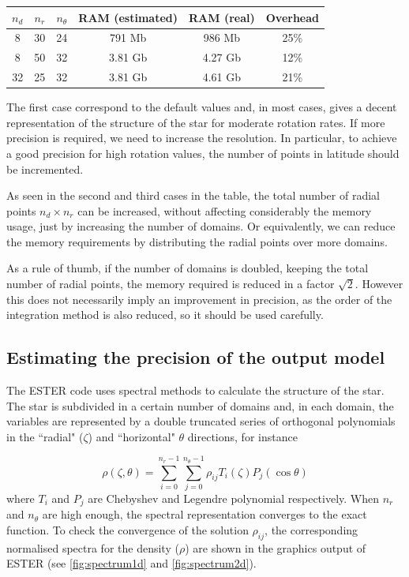 \begin{center}
\begin{tabular}{c|c|c|c|c|c}
$n_d$&$n_r$&$n_\theta$&RAM (estimated)&RAM (real)&Overhead\\
\hline
8&30&24& 791 Mb & 986 Mb & 25\% \\
8&50&32& 3.81 Gb & 4.27 Gb & 12\% \\
32&25&32& 3.81 Gb & 4.61 Gb & 21\% \\
\end{tabular}
\end{center}

The first case correspond to the default values and, in most cases,
gives a decent representation of the structure of the star for moderate
rotation rates.  If more precision is required, we need to increase the
resolution. In particular, to achieve a good precision for high rotation
values, the number of points in latitude should be incremented.

As seen in the second and third cases in the table, the total number
of radial points $n_d\times n_r$ can be increased, without affecting
considerably the memory usage, just by increasing the number of domains.
Or equivalently, we can reduce the memory requirements by distributing
the radial points over more domains.

As a rule of thumb, if the number of domains is doubled, keeping the
total number of radial points, the memory required is reduced in a factor
$\sqrt{2}$. However this does not necessarily imply an improvement
in precision, as the order of the integration method is also reduced,
so it should be used carefully.

\subsection{Estimating the precision of the output model}

The ESTER code uses spectral methods to calculate the structure of
the star.  The star is subdivided in a certain number of domains and, in
each domain, the variables are represented by a double truncated series
of orthogonal polynomials in the ``radial" ($\zeta$) and ``horizontal"
$\theta$ directions, for instance

\[\rho(\zeta,\theta)=
\sum_{i=0}^{n_r-1}\sum_{j=0}^{n_\theta-1}\rho_{ij}T_i(\zeta)P_j(\cos\theta)\]
where $T_i$ and $P_j$ are Chebyshev and Legendre polynomial
respectively.
When $n_r$ and $n_\theta$ are high enough, the spectral representation
converges to the exact function.  To check the convergence of
the solution $\rho_{ij}$, the corresponding normalised spectra for
the density ($\rho$) are shown in the graphics output of ESTER (see
\ref{fig:spectrum1d} and \ref{fig:spectrum2d}).

